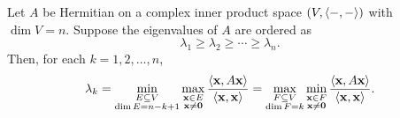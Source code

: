 \begin{theorem}
Let $A$ be Hermitian on a complex inner product space
$(V,\left\langle -, - \right\rangle)$ with $\dim V=n$. Suppose the eigenvalues of $A$
are ordered as
\[
    \lambda_1\ge \lambda_2\ge \cdots \ge \lambda_n.
\]
Then, for each $k=1,2,\dots,n$,
\[
    \lambda_k
    =
    \min_{\substack{E\subseteq V \\ \dim E=n-k+1}}
    \max_{\substack{\mathbf{x}\in E \\ \mathbf{x}\ne \mathbf{0}}}
    \frac{\left\langle \mathbf{x}, A\mathbf{x} \right\rangle}
         {\left\langle \mathbf{x}, \mathbf{x} \right\rangle}
    =
    \max_{\substack{F\subseteq V \\ \dim F=k}}
    \min_{\substack{\mathbf{x}\in F \\ \mathbf{x}\ne \mathbf{0}}}
    \frac{\left\langle \mathbf{x}, A\mathbf{x} \right\rangle}
         {\left\langle \mathbf{x}, \mathbf{x} \right\rangle}.
\]
\end{theorem}

